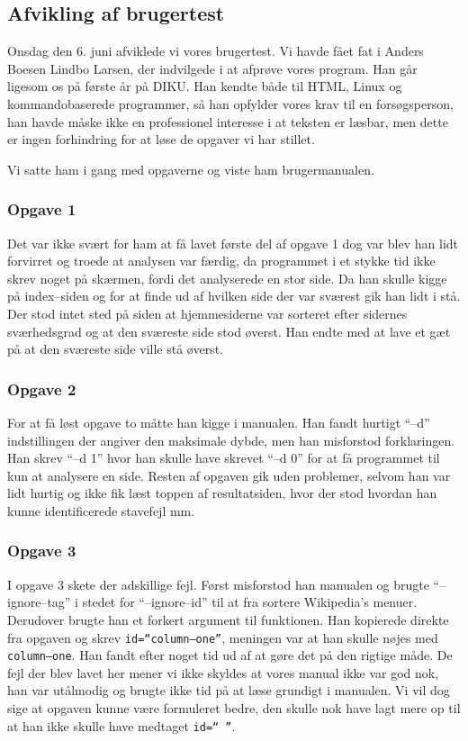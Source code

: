 \documentclass[a4paper,oneside]{memoir}
\begin{document}
\subsection{Afvikling af brugertest}
Onsdag den 6. juni afviklede vi vores brugertest. Vi havde fået fat i
Anders Boesen Lindbo Larsen, der indvilgede i at afprøve vores
program. Han går ligesom os på første år på DIKU. Han kendte både til
HTML, Linux og kommandobaserede programmer, så han opfylder vores krav
til en forsøgsperson, han havde måske ikke en professionel interesse i
at teksten er læsbar, men dette er ingen forhindring for at løse de
opgaver vi har stillet.

Vi satte ham i gang med opgaverne og viste ham brugermanualen.

\subsubsection{Opgave 1}
Det var ikke svært for ham at få lavet første del af opgave 1 dog var
blev han lidt forvirret og troede at analysen var færdig, da
programmet i et stykke tid ikke skrev noget på skærmen, fordi det
analyserede en stor side. Da han skulle kigge på index--siden og for
at finde ud af hvilken side der var sværest gik han lidt i stå. Der
stod intet sted på siden at hjemmesiderne var sorteret efter sidernes
sværhedsgrad og at den sværeste side stod øverst. Han endte med at
lave et gæt på at den sværeste side ville stå øverst.

\subsubsection{Opgave 2}
For at få løst opgave to måtte han kigge i manualen. Han fandt hurtigt
``--d'' indstillingen der angiver den maksimale dybde, men han
misforstod forklaringen. Han skrev ``--d 1'' hvor han skulle have
skrevet ``--d 0'' for at få programmet til kun at analysere en side.
Resten af opgaven gik uden problemer, selvom han var lidt hurtig og
ikke fik læst toppen af resultatsiden, hvor der stod hvordan han kunne
identificerede stavefejl mm.

\subsubsection{Opgave 3}
I opgave 3 skete der adskillige fejl. Først misforstod han manualen og
brugte ``--ignore--tag'' i stedet for ``--ignore--id'' til at fra
sortere Wikipedia's menuer. Derudover brugte han et forkert argument
til funktionen. Han kopierede direkte fra opgaven og skrev
\texttt{id=``column--one''}, meningen var at han skulle nøjes med
\texttt{column--one}. Han fandt efter noget tid ud af at gøre det på
den rigtige måde. De fejl der blev lavet her mener vi ikke skyldes at
vores manual ikke var god nok, han var utålmodig og brugte ikke tid på
at læse grundigt i manualen. Vi vil dog sige at opgaven kunne være
formuleret bedre, den skulle nok have lagt mere op til at han ikke
skulle have medtaget \texttt{id=`` ''}.
\end{document}
